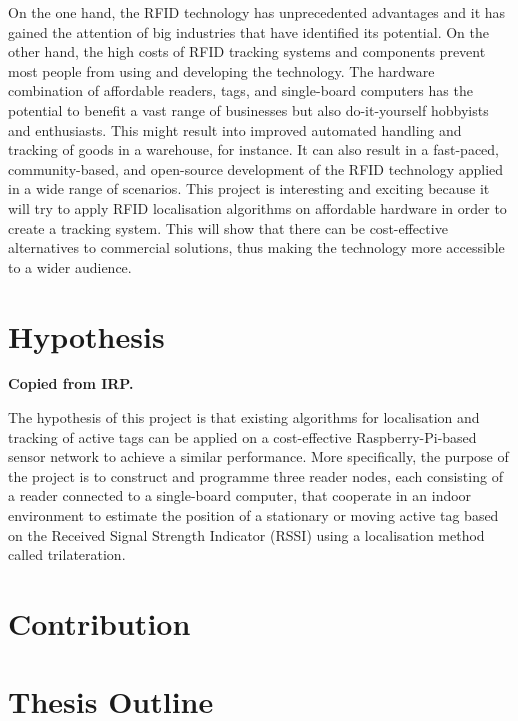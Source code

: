 On the one hand, the RFID technology has unprecedented advantages and it has gained the attention of big industries that have identified its potential. On the other hand, the high costs of RFID tracking systems and components prevent most people from using and developing the technology. The hardware combination of affordable readers, tags, and single-board computers has the potential to benefit a vast range of businesses but also do-it-yourself hobbyists and enthusiasts. This might result into improved automated handling and tracking of goods in a warehouse, for instance. It can also result in a fast-paced, community-based, and open-source development of the RFID technology applied in a wide range of scenarios. This  project is interesting and exciting because it will try to apply RFID localisation algorithms on affordable hardware in order to create a tracking system. This will show that there can be cost-effective alternatives to commercial solutions, thus making the technology more accessible to a wider audience.

\section{Hypothesis}

\textbf{Copied from IRP.}

The hypothesis of this project is that existing algorithms for localisation and tracking of active tags can be applied on a cost-effective Raspberry-Pi-based sensor network to achieve a similar performance. More specifically, the purpose of the project is to construct and programme three reader nodes, each consisting of a reader connected to a single-board computer, that cooperate in an indoor environment to estimate the position of a stationary or moving active tag based on the Received Signal Strength Indicator (RSSI) using a localisation method called trilateration.

\section{Contribution}

\section{Thesis Outline}


